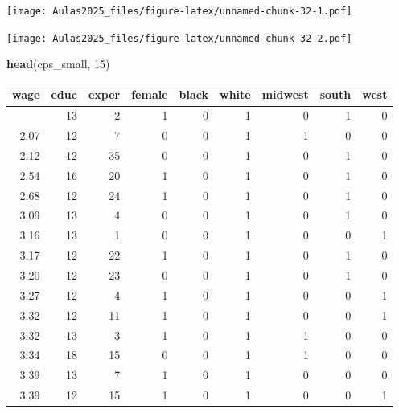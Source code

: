 \documentclass[
]{book}
\newenvironment{Shaded}{\begin{snugshade}}{\end{snugshade}}
\newcommand{\AttributeTok}[1]{\textcolor[rgb]{0.13,0.29,0.53}{#1}}
\newcommand{\DecValTok}[1]{\textcolor[rgb]{0.00,0.00,0.81}{#1}}
\newcommand{\FunctionTok}[1]{\textcolor[rgb]{0.13,0.29,0.53}{\textbf{#1}}}
\newcommand{\NormalTok}[1]{#1}
\newcommand{\SpecialCharTok}[1]{\textcolor[rgb]{0.81,0.36,0.00}{\textbf{#1}}}
\newcommand{\StringTok}[1]{\textcolor[rgb]{0.31,0.60,0.02}{#1}}
\begin{document}
\begin{Shaded}
\end{Shaded}

\texttt{[image: Aulas2025\_files/figure-latex/unnamed-chunk-32-1.pdf]}

\begin{Shaded}
\end{Shaded}

\texttt{[image: Aulas2025\_files/figure-latex/unnamed-chunk-32-2.pdf]}

\begin{Shaded}
\begin{Highlighting}[]
\FunctionTok{head}\NormalTok{(cps\_small, }\DecValTok{15}\NormalTok{)}
\end{Highlighting}
\end{Shaded}

\begin{longtable}[]{@{}rrrrrrrrr@{}}
\toprule\noalign{}
wage & educ & exper & female & black & white & midwest & south & west \\
\midrule\noalign{}
\endhead
\bottomrule\noalign{}
\endlastfoot
2.03 & 13 & 2 & 1 & 0 & 1 & 0 & 1 & 0 \\
2.07 & 12 & 7 & 0 & 0 & 1 & 1 & 0 & 0 \\
2.12 & 12 & 35 & 0 & 0 & 1 & 0 & 1 & 0 \\
2.54 & 16 & 20 & 1 & 0 & 1 & 0 & 1 & 0 \\
2.68 & 12 & 24 & 1 & 0 & 1 & 0 & 1 & 0 \\
3.09 & 13 & 4 & 0 & 0 & 1 & 0 & 1 & 0 \\
3.16 & 13 & 1 & 0 & 0 & 1 & 0 & 0 & 1 \\
3.17 & 12 & 22 & 1 & 0 & 1 & 0 & 1 & 0 \\
3.20 & 12 & 23 & 0 & 0 & 1 & 0 & 1 & 0 \\
3.27 & 12 & 4 & 1 & 0 & 1 & 0 & 0 & 1 \\
3.32 & 12 & 11 & 1 & 0 & 1 & 0 & 0 & 1 \\
3.32 & 13 & 3 & 1 & 0 & 1 & 1 & 0 & 0 \\
3.34 & 18 & 15 & 0 & 0 & 1 & 1 & 0 & 0 \\
3.39 & 13 & 7 & 1 & 0 & 1 & 0 & 0 & 0 \\
3.39 & 12 & 15 & 1 & 0 & 1 & 0 & 0 & 1 \\
\end{longtable}
\end{document}
